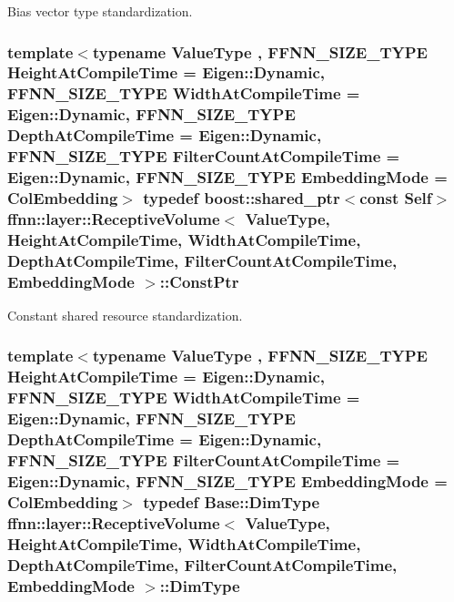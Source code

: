 Bias vector type standardization. 

\hypertarget{classffnn_1_1layer_1_1_receptive_volume_ad3e48c66c8bc1b5f3bc20dc8c75f2c64}{
\subsubsection[{Const\-Ptr}]{\setlength{\rightskip}{0pt plus 5cm}template$<$typename Value\-Type , F\-F\-N\-N\-\_\-\-S\-I\-Z\-E\-\_\-\-T\-Y\-P\-E Height\-At\-Compile\-Time = Eigen\-::\-Dynamic, F\-F\-N\-N\-\_\-\-S\-I\-Z\-E\-\_\-\-T\-Y\-P\-E Width\-At\-Compile\-Time = Eigen\-::\-Dynamic, F\-F\-N\-N\-\_\-\-S\-I\-Z\-E\-\_\-\-T\-Y\-P\-E Depth\-At\-Compile\-Time = Eigen\-::\-Dynamic, F\-F\-N\-N\-\_\-\-S\-I\-Z\-E\-\_\-\-T\-Y\-P\-E Filter\-Count\-At\-Compile\-Time = Eigen\-::\-Dynamic, F\-F\-N\-N\-\_\-\-S\-I\-Z\-E\-\_\-\-T\-Y\-P\-E Embedding\-Mode = Col\-Embedding$>$ typedef boost\-::shared\-\_\-ptr$<$const {\bf Self}$>$ {\bf ffnn\-::layer\-::\-Receptive\-Volume}$<$ Value\-Type, Height\-At\-Compile\-Time, Width\-At\-Compile\-Time, Depth\-At\-Compile\-Time, Filter\-Count\-At\-Compile\-Time, {\bf Embedding\-Mode} $>$\-::{\bf Const\-Ptr}}}\label{classffnn_1_1layer_1_1_receptive_volume_ad3e48c66c8bc1b5f3bc20dc8c75f2c64}


Constant shared resource standardization. 

\hypertarget{classffnn_1_1layer_1_1_receptive_volume_ab0bd7607040aa08bf9cdfcc30e2794ef}{
\subsubsection[{Dim\-Type}]{\setlength{\rightskip}{0pt plus 5cm}template$<$typename Value\-Type , F\-F\-N\-N\-\_\-\-S\-I\-Z\-E\-\_\-\-T\-Y\-P\-E Height\-At\-Compile\-Time = Eigen\-::\-Dynamic, F\-F\-N\-N\-\_\-\-S\-I\-Z\-E\-\_\-\-T\-Y\-P\-E Width\-At\-Compile\-Time = Eigen\-::\-Dynamic, F\-F\-N\-N\-\_\-\-S\-I\-Z\-E\-\_\-\-T\-Y\-P\-E Depth\-At\-Compile\-Time = Eigen\-::\-Dynamic, F\-F\-N\-N\-\_\-\-S\-I\-Z\-E\-\_\-\-T\-Y\-P\-E Filter\-Count\-At\-Compile\-Time = Eigen\-::\-Dynamic, F\-F\-N\-N\-\_\-\-S\-I\-Z\-E\-\_\-\-T\-Y\-P\-E Embedding\-Mode = Col\-Embedding$>$ typedef {\bf Base\-::\-Dim\-Type} {\bf ffnn\-::layer\-::\-Receptive\-Volume}$<$ Value\-Type, Height\-At\-Compile\-Time, Width\-At\-Compile\-Time, Depth\-At\-Compile\-Time, Filter\-Count\-At\-Compile\-Time, {\bf Embedding\-Mode} $>$\-::{\bf Dim\-Type}}}\label{classffnn_1_1layer_1_1_receptive_volume_ab0bd7607040aa08bf9cdfcc30e2794ef}


